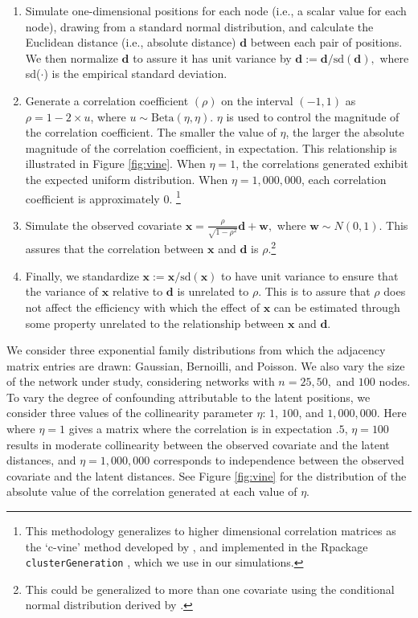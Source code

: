 \documentclass[11pt]{article}
\newcommand{\R}{\textsf{R}\space} %
\begin{document}
\begin{enumerate}
\item  Simulate one-dimensional positions for each node (i.e., a scalar value for each node), drawing from a standard normal distribution, and calculate the Euclidean distance (i.e., absolute distance) $\mathbf{d}$ between each pair of positions. We then normalize $\mathbf{d}$ to assure it has unit variance by $\mathbf{d} := \mathbf{d}/ \text{sd}(\mathbf{d}),$ where sd($\cdot$) is the empirical standard deviation.


 \item Generate a correlation coefficient $(\rho)$ on the interval $(-1,1)$ as $\rho = 1-2\times u$, where $u \sim  \text{Beta}(\eta,\eta)$. $\eta$ is used to control the magnitude of the correlation coefficient. The smaller the value of $\eta$, the larger the absolute magnitude of the correlation coefficient, in expectation. This relationship is illustrated in Figure \ref{fig:vine}. When $\eta = 1$, the correlations generated exhibit the expected uniform distribution. When $\eta = 1,000,000$, each correlation coefficient is approximately 0. \footnote{This methodology generalizes to higher dimensional correlation matrices as the `c-vine' method developed by \cite{lewandowski2009generating}, and implemented in the \R package \texttt{clusterGeneration} \citep{clusterGeneration}, which we use in our simulations.}

 \item Simulate the observed covariate $\mathbf{x} = \frac{\rho}{\sqrt{1-\rho^2}}\mathbf{d}+\mathbf{w},$ where $\mathbf{w} \sim N(0,1)$. This assures that the correlation between $\mathbf{x}$ and $\mathbf{d}$ is $\rho$.\footnote{This could be generalized to more than one covariate using the conditional normal distribution derived by \cite[pp. 116--117]{eaton1983}.}
 
 \item Finally, we standardize $\mathbf{x} := \mathbf{x}/ \text{sd}(\mathbf{x})$ to have unit variance to ensure that the variance of $\mathbf{x}$ relative to $\mathbf{d}$ is unrelated to $\rho$. This is to assure that $\rho$ does not affect the efficiency with which the effect of $\mathbf{x}$ can be estimated through some property unrelated to the relationship between $\mathbf{x}$ and $\mathbf{d}$.

\end{enumerate} 

We consider three exponential family distributions from which the adjacency matrix entries are drawn: Gaussian, Bernoilli, and Poisson.  We also vary the size of the network under study, considering networks with $n = 25, 50,$ and $100$ nodes. To vary the degree of confounding attributable to the latent positions, we consider three values of the collinearity parameter $\eta$: $1$, $100$, and $1,000,000$. Here  where $\eta = 1$ gives a matrix where the correlation is in expectation $.5$, $\eta = 100$ results in moderate collinearity between the observed covariate and the latent distances, and $\eta = 1,000,000$ corresponds to independence between the observed covariate and the latent distances. See Figure \ref{fig:vine} for the distribution of the absolute value of the correlation generated at each value of $\eta$.
\end{document}
